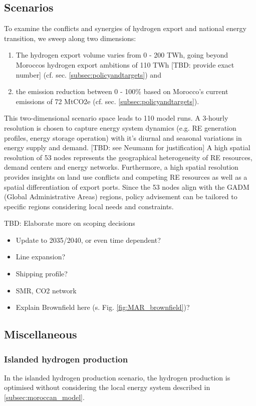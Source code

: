\subsection{Scenarios}
\label{subsec:scenarios}
To examine the conflicts and synergies of hydrogen export and national energy transition, we sweep along two dimensions:
\begin{enumerate}
    \item The hydrogen export volume varies from 0 - 200 TWh, going beyond Moroccos hydrogen export ambitions of 110 TWh [TBD: provide exact number] (cf. sec. \ref{subsec:policyandtargets}) and
    \item the emission reduction between 0 - 100\% based on Morocco's current emissions of 72 MtCO2e (cf. sec. \ref{subsec:policyandtargets}).
\end{enumerate}
This two-dimensional scenario space leads to 110 model runs. 
A 3-hourly resolution is chosen to capture energy system dynamics (e.g. RE generation profiles, energy storage operation) with it's diurnal and seasonal variations in energy supply and demand. [TBD: see Neumann for justification]
A high spatial resolution of 53 nodes represents the geographical heterogeneity of RE resources, demand centers and energy networks. Furthermore, a high spatial resolution provides insights on land use conflicts and competing RE resources as well as a spatial differentiation of export ports. Since the 53 nodes align with the GADM (Global Administrative Areas) regions, policy advisement can be tailored to specific regions considering local needs and constraints.

TBD: Elaborate more on scoping decisions
\begin{itemize}
    \item Update to 2035/2040, or even time dependent?
    \item Line expansion?
    \item Shipping profile?
    \item SMR, CO2 network
    \item Explain Brownfield here (s. Fig. \ref{fig:MAR_brownfield})?
\end{itemize}



\subsection{Miscellaneous}

\subsubsection{Islanded hydrogen production}
In the islanded hydrogen production scenario, the hydrogen production is optimised without considering the local energy system described in \ref{subsec:moroccan_model}.

